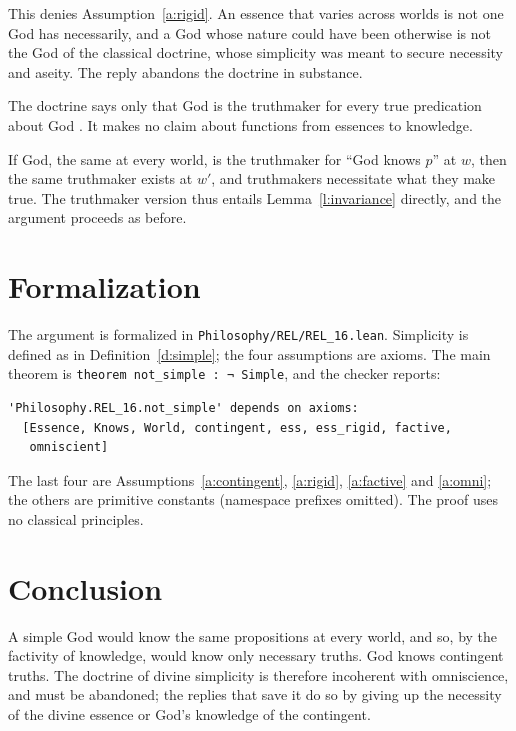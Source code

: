 \documentclass{situationist-preprint}
\begin{document}
\begin{reply}
This denies Assumption~\ref{a:rigid}. An essence that varies across worlds is not one God has necessarily, and a God whose nature could have been otherwise is not the God of the classical doctrine, whose simplicity was meant to secure necessity and aseity. The reply abandons the doctrine in substance.
\end{reply}

\begin{objection}[Truthmakers]
The doctrine says only that God is the truthmaker for every true predication about God \citep{Brower2008}. It makes no claim about functions from essences to knowledge.
\end{objection}

\begin{reply}
If God, the same at every world, is the truthmaker for \enquote{God knows $p$} at $w$, then the same truthmaker exists at $w'$, and truthmakers necessitate what they make true. The truthmaker version thus entails Lemma~\ref{l:invariance} directly, and the argument proceeds as before.
\end{reply}

\section{Formalization}

The argument is formalized in \nolinkurl{Philosophy/REL/REL_16.lean}. Simplicity is defined as in Definition~\ref{d:simple}; the four assumptions are axioms. The main theorem is \texttt{theorem not\_simple : ¬ Simple}, and the checker reports:

\begin{lstlisting}
'Philosophy.REL_16.not_simple' depends on axioms:
  [Essence, Knows, World, contingent, ess, ess_rigid, factive,
   omniscient]
\end{lstlisting}

The last four are Assumptions~\ref{a:contingent}, \ref{a:rigid}, \ref{a:factive} and \ref{a:omni}; the others are primitive constants (namespace prefixes omitted). The proof uses no classical principles.

\section{Conclusion}

A simple God would know the same propositions at every world, and so, by the factivity of knowledge, would know only necessary truths. God knows contingent truths. The doctrine of divine simplicity is therefore incoherent with omniscience, and must be abandoned; the replies that save it do so by giving up the necessity of the divine essence or God's knowledge of the contingent.
\end{document}
